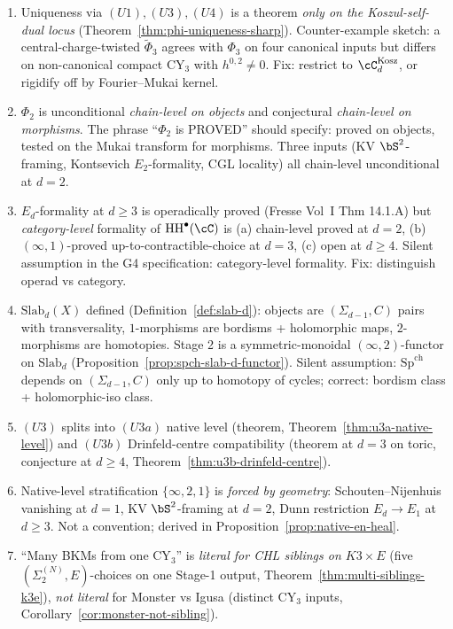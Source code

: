 \documentclass[11pt]{article}
\theoremstyle{definition}
\providecommand{\SpCh}{\mathrm{Sp}^{\mathrm{ch}}}
\providecommand{\HH}{\mathrm{HH}}
\begin{document}
\begin{enumerate}[leftmargin=*]
\item[\textbf{C1.}] Uniqueness via $(U1), (U3), (U4)$ is a theorem
\emph{only on the Koszul-self-dual locus}
(Theorem~\ref{thm:phi-uniqueness-sharp}). Counter-example sketch: a
central-charge-twisted $\widetilde\Phi_3$ agrees with $\Phi_3$ on four
canonical inputs but differs on non-canonical compact CY$_3$ with
$h^{0,2} \neq 0$. Fix: restrict to $\cC_d^{\mathrm{Kosz}}$, or
rigidify off by Fourier--Mukai kernel.
\item[\textbf{C2.}] $\Phi_2$ is unconditional \emph{chain-level on
objects} and conjectural \emph{chain-level on morphisms}. The phrase
``$\Phi_2$ is PROVED'' should specify: proved on objects, tested on
the Mukai transform for morphisms. Three inputs (KV $\bS^2$-framing,
Kontsevich $E_2$-formality, CGL locality) all chain-level
unconditional at $d = 2$.
\item[\textbf{C3.}] $E_d$-formality at $d \geq 3$ is operadically proved
(Fresse Vol~I Thm 14.1.A) but \emph{category-level} formality of
$\HH^\bullet(\cC)$ is (a) chain-level proved at $d = 2$, (b)
$(\infty,1)$-proved up-to-contractible-choice at $d = 3$, (c) open
at $d \geq 4$. Silent assumption in the G4 specification: category-level
formality. Fix: distinguish operad vs category.
\item[\textbf{C4.}] $\mathrm{Slab}_d(X)$ defined
(Definition~\ref{def:slab-d}): objects are $(\Sigma_{d-1}, C)$ pairs
with transversality, $1$-morphisms are bordisms + holomorphic maps,
$2$-morphisms are homotopies. Stage 2 is a symmetric-monoidal
$(\infty, 2)$-functor on $\mathrm{Slab}_d$
(Proposition~\ref{prop:spch-slab-d-functor}).
Silent assumption: $\SpCh$ depends on $(\Sigma_{d-1}, C)$ only up to
homotopy of cycles; correct: bordism class + holomorphic-iso class.
\item[\textbf{C5.}] $(U3)$ splits into $(U3a)$ native level (theorem,
Theorem~\ref{thm:u3a-native-level}) and $(U3b)$ Drinfeld-centre
compatibility (theorem at $d = 3$ on toric, conjecture at
$d \geq 4$, Theorem~\ref{thm:u3b-drinfeld-centre}).
\item[\textbf{C6.}] Native-level stratification $\{\infty, 2, 1\}$ is
\emph{forced by geometry}: Schouten--Nijenhuis vanishing at $d = 1$,
KV $\bS^2$-framing at $d = 2$, Dunn restriction $E_d \to E_1$ at
$d \geq 3$. Not a convention; derived in
Proposition~\ref{prop:native-en-heal}.
\item[\textbf{C7.}] ``Many BKMs from one CY$_3$'' is
\emph{literal for CHL siblings on $K3 \times E$} (five
$(\Sigma_2^{(N)}, E)$-choices on one Stage-1 output,
Theorem~\ref{thm:multi-siblings-k3e}), \emph{not literal} for
Monster vs Igusa (distinct CY$_3$ inputs,
Corollary~\ref{cor:monster-not-sibling}).
\end{enumerate}
\end{document}

